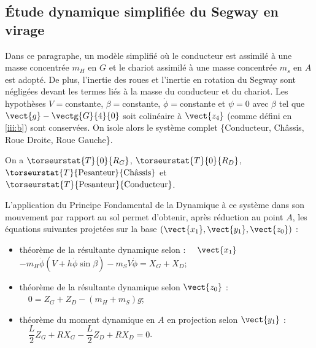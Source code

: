 \subsection{\'Etude dynamique simplifiée du Segway en virage \label{iii:b}}

\ifprof
\else

Dans ce paragraphe, un modèle simplifié où le conducteur est assimilé à une masse concentrée $m_H$ en $G$  et le chariot  assimilé à une masse concentrée $m_s$ en $A$ est adopté. De plus, l’inertie des roues et l'inertie en rotation du Segway sont négligées devant les termes liés à la masse du conducteur et du chariot. Les hypothèses $V =$constante, $\beta =$constante, $\dot{\phi} =$constante et $\psi=0$ avec $\beta$ tel que $\vect{g}-\vectg{G}{4}{0}$ soit colinéaire à 
$\vect{z_4}$ (comme défini en \ref{iii:b}) sont conservées. On isole alors le système complet \{Conducteur, Châssis, Roue Droite, Roue Gauche\}. 
\fi

\ifprof
\begin{corrige}
On a $\torseurstat{T}{0}{R_G}$, $\torseurstat{T}{0}{R_D}$, $\torseurstat{T}{\text{Pesanteur}}{\text{Châssis}}$ et $\torseurstat{T}{\text{Pesanteur}}{\text{Conducteur}}$.

\end{corrige}
\else
\fi

\ifprof
\else

L’application du Principe Fondamental de la Dynamique à ce système dans son mouvement par rapport au sol permet d’obtenir, après réduction au point $A$, les équations suivantes projetées sur la base $\left(\vect{x_1},\vect{y_1},\vect{z_0} \right)$ :
\begin{itemize} 
\item théorème de la résultante dynamique selon : $\quad \vect{x_1}$
$-m_H\dot{\phi} \left(V + h\dot{\phi} \sin\beta\right)-m_SV\dot{\phi} =X_G + X_D$;
\item théorème de la résultante dynamique selon $\vect{z_0}$  : $\quad 0=Z_G + Z_D - \left(m_H+m_S\right)g$;
\item théorème du moment dynamique en $A$ en projection selon $\vect{y_1}$  : $\quad \dfrac{L}{2}Z_G + RX_G - \dfrac{L}{2}Z_D + RX_D= 0$.
 \end{itemize}
 \fi
 
\ifprof
\begin{corrige}

\end{corrige}
\else
\fi



